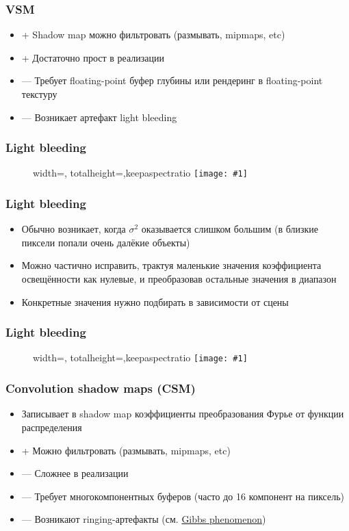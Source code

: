 \documentclass[10pt]{beamer}
\newcommand{\slideimage}[1]{
  \begin{figure}
    \begin{adjustbox}{width=\textwidth, totalheight=\textheight-2\baselineskip-2\baselineskip,keepaspectratio}
      \texttt{[image: \#1]}
    \end{adjustbox}
  \end{figure}
}
\begin{document}
\begin{frame}[fragile]
\frametitle{VSM}
\begin{itemize}
\item {\color{green}+} Shadow map можно фильтровать (размывать, mipmaps, etc)
\item {\color{green}+} Достаточно прост в реализации
\item {\color{red}—} Требует floating-point буфер глубины или рендеринг в floating-point текстуру
\item {\color{red}—} Возникает артефакт light bleeding
\end{itemize}
\end{frame}

\begin{frame}[fragile]
\frametitle{Light bleeding}
\slideimage{vsm_light_bleeding.png}
\end{frame}

\begin{frame}[fragile]
\frametitle{Light bleeding}
\begin{itemize}
\item Обычно возникает, когда \begin{math}\sigma^2\end{math} оказывается слишком большим (в близкие пиксели попали очень далёкие объекты)
\pause
\item Можно частично исправить, трактуя маленькие значения коэффициента освещённости как нулевые, и преобразовав остальные значения в диапазон \begin{math}[0, 1]\end{math}
\pause
\item Конкретные значения нужно подбирать в зависимости от сцены
\end{itemize}
\end{frame}

\begin{frame}[fragile]
\frametitle{Light bleeding}
\slideimage{light_bleeding_scheme.jpg}
\end{frame}

\begin{frame}[fragile]
\frametitle{Convolution shadow maps (CSM)}
\begin{itemize}
\item Записывает в shadow map коэффициенты преобразования Фурье от функции распределения
\pause
\item {\color{green}+} Можно фильтровать (размывать, mipmaps, etc)
\item {\color{red}—} Сложнее в реализации
\item {\color{red}—} Требует многокомпонентных буферов (часто до 16 компонент на пиксель)
\item {\color{red}—} Возникают ringing-артефакты (см. \href{https://en.wikipedia.org/wiki/Gibbs_phenomenon}{Gibbs phenomenon})
\end{itemize}
\end{frame}
\end{document}
